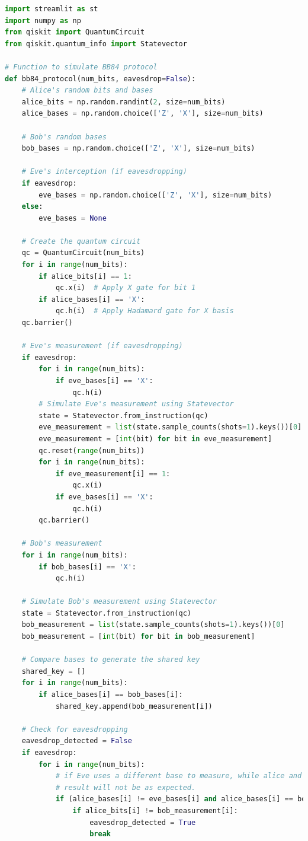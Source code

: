 \documentclass[12pt]{ieeetj}
\begin{document}
\begin{lstlisting}[language=Python, caption= Interactive eavesdropping demo for bb84, label=code:iedbb84]
import streamlit as st
import numpy as np
from qiskit import QuantumCircuit
from qiskit.quantum_info import Statevector

# Function to simulate BB84 protocol
def bb84_protocol(num_bits, eavesdrop=False):
    # Alice's random bits and bases
    alice_bits = np.random.randint(2, size=num_bits)
    alice_bases = np.random.choice(['Z', 'X'], size=num_bits)

    # Bob's random bases
    bob_bases = np.random.choice(['Z', 'X'], size=num_bits)

    # Eve's interception (if eavesdropping)
    if eavesdrop:
        eve_bases = np.random.choice(['Z', 'X'], size=num_bits)
    else:
        eve_bases = None

    # Create the quantum circuit
    qc = QuantumCircuit(num_bits)
    for i in range(num_bits):
        if alice_bits[i] == 1:
            qc.x(i)  # Apply X gate for bit 1
        if alice_bases[i] == 'X':
            qc.h(i)  # Apply Hadamard gate for X basis
    qc.barrier()

    # Eve's measurement (if eavesdropping)
    if eavesdrop:
        for i in range(num_bits):
            if eve_bases[i] == 'X':
                qc.h(i)
        # Simulate Eve's measurement using Statevector
        state = Statevector.from_instruction(qc)
        eve_measurement = list(state.sample_counts(shots=1).keys())[0]
        eve_measurement = [int(bit) for bit in eve_measurement]
        qc.reset(range(num_bits))
        for i in range(num_bits):
            if eve_measurement[i] == 1:
                qc.x(i)
            if eve_bases[i] == 'X':
                qc.h(i)
        qc.barrier()

    # Bob's measurement
    for i in range(num_bits):
        if bob_bases[i] == 'X':
            qc.h(i)

    # Simulate Bob's measurement using Statevector
    state = Statevector.from_instruction(qc)
    bob_measurement = list(state.sample_counts(shots=1).keys())[0]
    bob_measurement = [int(bit) for bit in bob_measurement]

    # Compare bases to generate the shared key
    shared_key = []
    for i in range(num_bits):
        if alice_bases[i] == bob_bases[i]:
            shared_key.append(bob_measurement[i])

    # Check for eavesdropping
    eavesdrop_detected = False
    if eavesdrop:
        for i in range(num_bits):
            # if Eve uses a different base to measure, while alice and bob match on base choice, then 
            # result will not be as expected. 
            if (alice_bases[i] != eve_bases[i] and alice_bases[i] == bob_bases[i]):
                if alice_bits[i] != bob_measurement[i]:
                    eavesdrop_detected = True
                    break


\end{lstlisting}
\end{document}
